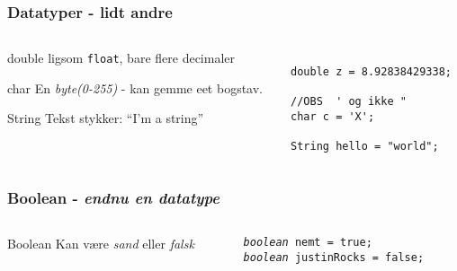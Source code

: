 \documentclass{beamer}
\begin{document}
\begin{frame}[fragile]
  \frametitle{Datatyper - lidt andre}
  \begin{columns}
    \begin{column}{0.4\textwidth}
      \begin{block}{double}
        ligsom \texttt{float}, bare flere decimaler
      \end{block}
      \begin{block}{char}
        En \emph{byte(0-255)} - kan gemme eet bogstav.
      \end{block}
      \begin{block}{String}
        Tekst stykker: ``I'm a string''
      \end{block}
    \end{column}
    \begin{column}{0.6\textwidth}    
\begin{verbatim}

double z = 8.92838429338;

//OBS  ' og ikke " 
char c = 'X'; 

String hello = "world";

\end{verbatim}

    \end{column}
  \end{columns}  
\end{frame}



\begin{frame}[fragile]
  \frametitle{Boolean - \emph{endnu en datatype}}
  \begin{columns}
    \begin{column}{0.4\textwidth}
      \begin{block}{Boolean}
        Kan være \emph{sand} eller \emph{falsk}
      \end{block}
    \end{column}
    \begin{column}{0.6\textwidth}    
      \texttt{\emph{boolean} nemt = true; }\\
      \texttt{\emph{boolean} justinRocks = false; }
    \end{column}
  \end{columns}  
\end{frame}
\end{document}
